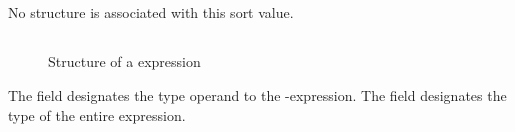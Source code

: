


\subsection{}
\label{sec:ifc:ExprSort:Unused0}

No structure is associated with this sort value.

\subsection{}
\label{sec:ifc:ExprSort:Typeid}

\begin{figure}[H]
	\centering
	\caption{Structure of a  expression}
	\label{fig:ifc-typeid-structure}
\end{figure}

The field  designates the type operand to the -expression.
The field  designates the type of the entire expression.



\subsection{}
\label{sec:ifc:ExprSort:DestructorCall}

